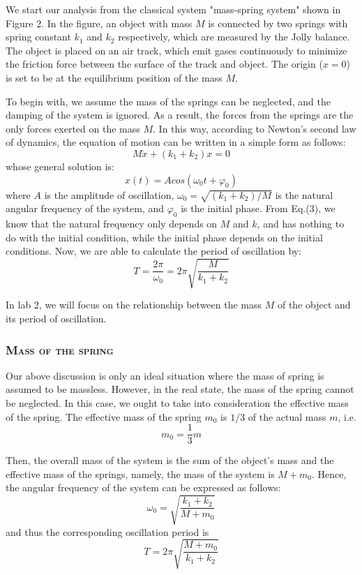 \documentclass[a4paper,12pt]{article}
\begin{document}
We start our analysis from the classical system "mass-spring system" shown in Figure 2. In the figure, an object with mass $M$ is connected by two springs with spring constant $k_1$ and $k_2$ respectively, which are measured by the Jolly balance. The object is placed on an air track, which emit gases continuously to minimize the friction force between the surface of the track and object. The origin ($x = 0$) is set to be at the equilibrium position of the mass $M$.
\par To begin with, we assume the mass of the springs can be neglected, and the damping of the system is ignored. As a result, the forces from the springs are the only forces exerted on the mass $M$. In this way, according to Newton’s second law of dynamics, the equation of motion can be written in a simple form as follows:
\begin{equation}
M\ddot{x} + (k_1 + k_2)x = 0
\end{equation}
whose general solution is:
\begin{equation}
x(t) = Acos(\omega_0 t + \varphi_0)
\end{equation}
where $A$ is the amplitude of oscillation, $\omega_0 = \sqrt{(k_1+k_2)/M}$ is the natural angular frequency of the system, and $\varphi_0$ is the initial phase. From Eq.(3), we know that the natural frequency only depends on $M$ and $k$, and has nothing to do with the initial condition, while the initial phase depends on the initial conditions. Now, we are able to calculate the period of oscillation by:
\begin{equation}
T = \frac{2\pi}{\omega_0} = 2\pi \sqrt{\frac{M}{k_1+k_2}}
\end{equation}
\par In lab 2, we will focus on the relationship between the mass $M$ of the object and its period of oscillation. 
\subsubsection{\textsc{Mass of the spring}}
Our above discussion is only an ideal situation where the mass of spring is assumed to be massless. However, in the real state, the mass of the spring cannot be neglected. In this case, we ought to take into consideration the effective mass of the spring. The effective mass of the spring $m_0$ is $1/3$ of the actual mass $m$, i.e.
\begin{equation}
m_0 = \frac{1}{3}m
\end{equation}
\par Then, the overall mass of the system is the sum of the object's mass and the effective mass of the springs, namely, the mass of the system is $M + m_0$. Hence, the angular frequency of the system can be expressed as follows:
\begin{equation}
\omega_0 = \sqrt{\frac{k_1+k_2}{M+m_0}}
\end{equation}
and thus the corresponding oscillation period is 
\begin{equation}
T = 2\pi \sqrt{\frac{M+m_0}{k_1+k_2}}
\end{equation}
\end{document}
